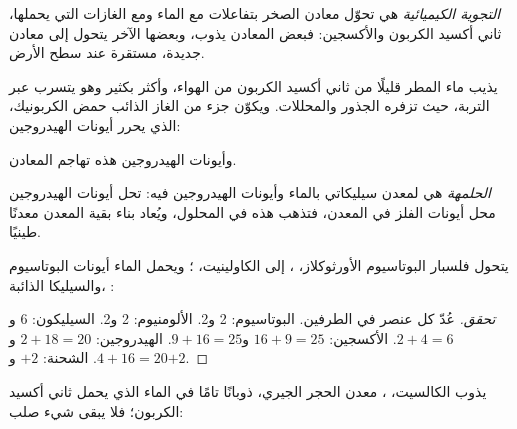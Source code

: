 \begin{definition}\label{def:g10:soil-formation:chemical-weathering}
\emph{التجوية الكيميائية} هي تحوّل معادن الصخر بتفاعلات مع
الماء ومع الغازات التي يحملها، ثاني أكسيد الكربون والأكسجين: فبعض المعادن يذوب،
وبعضها الآخر يتحول إلى معادن جديدة، مستقرة عند سطح الأرض.
\end{definition}

يذيب ماء المطر قليلًا من ثاني أكسيد الكربون من الهواء، وأكثر بكثير وهو يتسرب عبر
التربة، حيث تزفره الجذور والمحللات. ويكوّن جزء من الغاز الذائب حمض الكربونيك، الذي
يحرر أيونات الهيدروجين:
\begin{center}
\end{center}
وأيونات الهيدروجين هذه تهاجم المعادن.

\begin{definition}[الحلمهة]\label{def:g10:soil-formation:hydrolysis}
\emph{الحلمهة} هي  لمعدن سيليكاتي بالماء وأيونات
الهيدروجين فيه: تحل أيونات الهيدروجين محل أيونات الفلز في المعدن، فتذهب هذه في
المحلول، ويُعاد بناء بقية المعدن معدنًا طينيًا.
\end{definition}

\begin{proposition}\label{prop:g10:soil-formation:hydrolysis}
يتحول فلسبار البوتاسيوم الأورثوكلاز، ، 
إلى  الكاولينيت، ؛ ويحمل الماء أيونات البوتاسيوم
والسيليكا الذائبة، :
\begin{center}
\end{center}
\end{proposition}

\begin{proof}[تحقق]
عُدّ كل عنصر في الطرفين. البوتاسيوم: 2 و2. الألومنيوم: 2 و2.
السيليكون: 6 و$2 + 4 = 6$. الأكسجين: $16 + 9 = 25$ و$9 + 16 = 25$.
الهيدروجين: $2 + 18 = 20$ و$4 + 16 = 20$. الشحنة: $+2$ و$+2$.
\end{proof}

\begin{proposition}\label{prop:g10:soil-formation:calcite}
يذوب الكالسيت، ، معدن الحجر الجيري، ذوبانًا تامًا في الماء
الذي يحمل ثاني أكسيد الكربون؛ فلا يبقى شيء صلب:
\begin{center}
\end{center}
\end{proposition}

